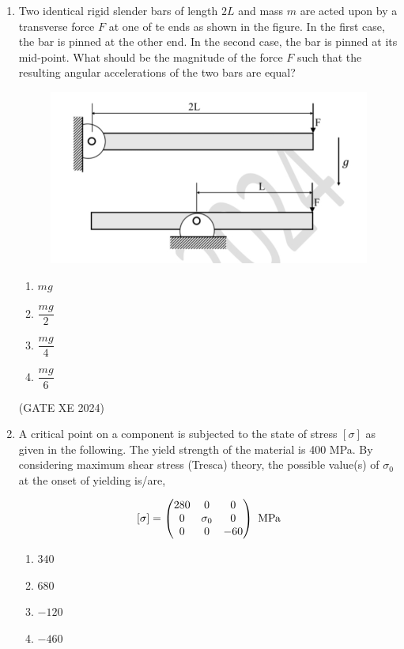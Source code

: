 \documentclass[12pt]{article}
\begin{document}
\begin{enumerate}
\begin{enumerate}
\item EF
\item FG
\item EG
\item EH
\end{enumerate}

(GATE XE 2024)

\item Two identical rigid slender bars of length $2L$ and mass $m$ are acted upon by a transverse force $F$ at one of te ends as shown in the figure. In the first case, the bar is pinned at the other end. In the second case, the bar is pinned at its mid-point. What should be the magnitude of the force $F$ such that the resulting angular accelerations of the two bars are equal?

\begin{figure}[H]
    \centering
    \includegraphics[width=0.5\columnwidth]{figs/ass5_d_q78.jpg}
    \caption{}
    \label{fig:placeholder}
\end{figure}

\begin{enumerate}
\item $mg$
\item $\dfrac{mg}{2}$
\item $\dfrac{mg}{4}$
\item $\dfrac{mg}{6}$
\end{enumerate}

(GATE XE 2024)

\item A critical point on a component is subjected to the state of stress $[\sigma]$ as given in the following. The yield strength of the material is 400 MPa. By considering maximum shear stress (Tresca) theory, the possible value(s) of $\sigma_0$ at the onset of yielding is/are,

$$
[\sigma] = \myvec{280 & 0 & 0 \\ 0 & \sigma_0 & 0 \\ 0 & 0 & -60} \ \text{MPa}
$$

\begin{enumerate}
\item $340$
\item $680$
\item $-120$
\item $-460$
\end{enumerate}


\end{enumerate}
\end{document}
